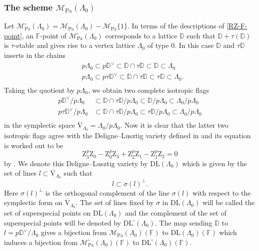 \documentclass[10pt]{amsart}
\numberwithin{equation}{section}
\theoremstyle{definition}
\def\Pa{\mathrm{Pa}}
\def\calM{\mathcal{M}}
\def\DD{\mathbb{D}}
\def\FF{\mathbb{F}}
\def\rmV{\mathrm{V}}
\def\rmZ{\mathrm{Z}}
\begin{document}
\subsubsection{The scheme $\calM_{\Pa}(\Lambda_{0})$} Let $\calM^{\square}_{\Pa}(\Lambda_{0})=\calM_{\Pa}(\Lambda_{0})-\calM_{\Pa}\{1\}$. In terms of the descriptions of \ref{RZ-F-point}, an $\FF$-point of $\calM^{\square}_{\Pa}(\Lambda_{0})$ corresponds to a lattice $\DD$ such that $\DD+\tau(\DD)$ is $\tau$-stable and gives rise to a vertex lattice $\Lambda_{0}$ of type $0$. In this case $\DD$ and  $\tau\DD$ inserts in the chains
\begin{equation*}
\begin{aligned}
& p\Lambda_{0}\subset p\DD^{\vee}\subset \DD\cap \tau{\DD} \subset \DD \subset \Lambda_{0}\\
&p\Lambda_{0}\subset p\tau\DD^{\vee}\subset  \DD\cap \tau{\DD} \subset \tau\DD \subset \Lambda_{0}.\\
\end{aligned}
\end{equation*}
Taking the quotient by $p\Lambda_{0}$, we obtain two complete isotropic flags
\begin{equation*}
\begin{aligned}
p\DD^{\vee}/p\Lambda_{0}&\subset  \DD\cap \tau{\DD}/p\Lambda_{0} \subset \DD/p\Lambda_{0} \subset \Lambda_{0}/p\Lambda_{0} \\
p\tau\DD^{\vee}/p\Lambda_{0}&\subset  \DD\cap \tau{\DD}/p\Lambda_{0} \subset \tau\DD/p\Lambda_{0} \subset \Lambda_{0}/p\Lambda_{0}\\
\end{aligned}
\end{equation*}
in the symplectic space $\overline{\rmV}_{\Lambda_{0}}=\Lambda_{0}/p\Lambda_{0}$. Now it is clear that the latter two isotropic flags agree with the Deligne--Lusztig variety defined in \cite[2.4]{DL} and its equation is worked out to be
\begin{equation}\label{DL-eq}
\rmZ_{3}^{p}\rmZ_{0}-\rmZ^{p}_{0}\rmZ_{3}+\rmZ^{p}_{2}\rmZ_{1}-\rmZ^{p}_{1}\rmZ_{2}=0
\end{equation}
by \cite[Theorem 3.6]{Wanga}. We denote this Deligne--Lusztig variety by $\mathrm{DL}(\Lambda_{0})$ which is given by the set of lines $l\subset\overline{\rmV}_{\Lambda_{0}}$ such that
\begin{equation*}
l\subset \sigma(l)^{\perp}.
\end{equation*}
Here $ \sigma(l)^{\perp}$ is the orthogonal complement of the line $\sigma(l)$ with respect to the symplectic form on $\overline{\rmV}_{\Lambda_{0}}$. The set of lines fixed by $\sigma$ in $\mathrm{DL}(\Lambda_{0})$ will be called the set of superspecial points on $\mathrm{DL}(\Lambda_{0})$ and the complement of the set of superspecial points will be  denoted by $\mathrm{DL}^{\square}(\Lambda_{0})$. The map sending $\DD$ to $l=p\DD^{\vee}/\Lambda_{0}$ gives a bijection from $\calM_{\Pa}(\Lambda_{0})(\FF)$ to $\mathrm{DL}(\Lambda_{0})(\FF)$ which induces a bijection from $\calM^{\square}_{\Pa}(\Lambda_{0})(\FF)$ to $\mathrm{DL}^{\square}(\Lambda_{0})(\FF)$.
\end{document}
